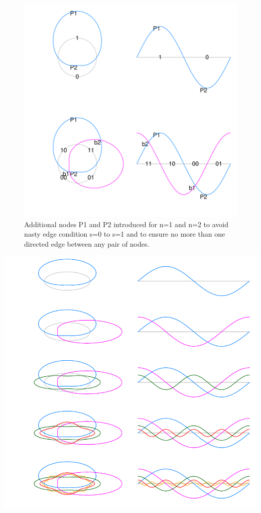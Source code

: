 \documentclass[a4paper]{article}
\begin{document}
\begin{figure}[H]\begin{center}
\includegraphics{Vennfig-rdovpspto2}
\caption{Additional nodes P1 and P2 introduced for n=1 and n=2 to avoid nasty edge condition s=0 to s=1
and to ensure no more than one directed edge between any pair of nodes.}
\end{center}\end{figure}

\includegraphics{Vennfig-rdovpsp}
\end{document}
